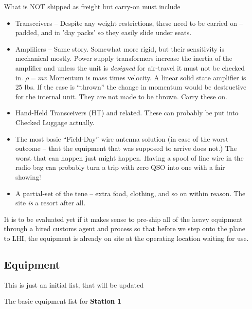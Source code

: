 \documentclass[11pt]{article}
\begin{document}
What is NOT shipped as freight but carry-on must include

\begin{itemize}
\item Transceivers -- Despite any weight restrictions, these need to
be carried on -- padded, and in 'day packs' so they easily slide under
seats.
\item Amplifiers -- Same story.  Somewhat more rigid, but their sensitivity
is mechanical mostly.  Power supply transformers increase the inertia of the
amplifier and unless the unit is {\textit{designed}} for air-travel
it must not be checked in. $\rho = mv$  Momentum is mass times
velocity. A linear solid state amplifier is 25 lbs.  If the case is ``thrown''
the change in momentum would be destructive for the internal unit.  They are
not made to be thrown.  Carry these on.
\item Hand-Held Transceivers (HT) and related.  These can probably be put into Checked
Luggage actually.
\item The most basic ``Field-Day'' wire antenna solution (in case of the
worst outcome -- that the equipment that was supposed to arrive does not.)
The worst that can happen just might happen. Having a spool of fine wire
in the radio bag can probably turn a trip with zero QSO into one with a fair
showing!
\item A partial-set of the {\gls{tene}} -- extra food, clothing,
and so on within reason.  The site {\textit{is}} a resort after all.
\end{itemize}

It is to be evaluated yet if it makes sense to pre-ship all of the
heavy equipment through a hired customs agent and process so that
before we step onto the plane to LHI, the equipment is already
on site at the operating location waiting for use.

\subsection{Equipment}

This is just an initial list, that will be updated

The basic equipment list for {\textbf{Station 1}}
\end{document}
